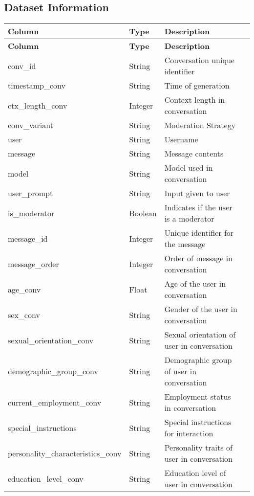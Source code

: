 \subsection{Dataset Information}

\renewcommand{\arraystretch}{1.3}
\begin{longtable}{|l|l|l|p{4cm}|}
    \hline
    \textbf{Column} & \textbf{Type} & \textbf{Description} \\
    \hline
    \endfirsthead
    \hline
    \textbf{Column} & \textbf{Type} & \textbf{Description} \\
    \hline
    \endhead
    \hline
    \endfoot
    \hline
    \endlastfoot

    conv\_id & String & Conversation unique identifier \\
    timestamp\_conv & String & Time of generation \\
    ctx\_length\_conv & Integer & Context length in conversation \\
    conv\_variant & String & Moderation Strategy \\
    user & String & Username \\
    message & String & Message contents \\
    model & String & Model used in conversation \\
    user\_prompt & String & Input given to user \\
    is\_moderator & Boolean & Indicates if the user is a moderator \\
    message\_id & Integer & Unique identifier for the message \\
    message\_order & Integer & Order of message in conversation \\
    age\_conv & Float & Age of the user in conversation \\
    sex\_conv & String & Gender of the user in conversation \\
    sexual\_orientation\_conv & String & Sexual orientation of user in conversation \\
    demographic\_group\_conv & String & Demographic group of user in conversation \\
    current\_employment\_conv & String & Employment status in conversation \\
    special\_instructions & String & Special instructions for interaction \\
    personality\_characteristics\_conv & String & Personality traits of user in conversation \\
    education\_level\_conv & String & Education level of user in conversation \\

\end{longtable}
